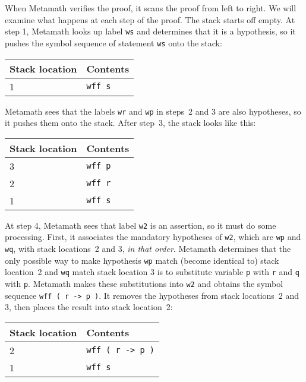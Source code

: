 When Metamath verifies the proof, it scans the proof from left to right.  We
will examine what happens at each step of the proof.  The stack starts off
empty.  At step 1, Metamath looks up label \texttt{ws} and determines that it is a
hypothesis, so it pushes the symbol sequence of statement \texttt{ws} onto the
stack:

\begin{center}\begin{tabular}{|l|l|}\hline
{Stack location} & {Contents} \\ \hline \hline
1 & \texttt{wff s} \\ \hline
\end{tabular}\end{center}

Metamath sees that the labels \texttt{wr} and \texttt{wp} in steps~2 and 3 are also
hypotheses, so it pushes them onto the stack.  After step~3, the stack looks
like
this:

\begin{center}\begin{tabular}{|l|l|}\hline
{Stack location} & {Contents} \\ \hline \hline
3 & \texttt{wff p} \\ \hline
2 & \texttt{wff r} \\ \hline
1 & \texttt{wff s} \\ \hline
\end{tabular}\end{center}

At step 4, Metamath sees that label \texttt{w2} is an assertion, so it must do
some processing.  First, it associates the mandatory hypotheses of \texttt{w2},
which are \texttt{wp} and \texttt{wq}, with stack locations~2 and 3, {\em in that
order}. Metamath determines that the only possible way
to make hypothesis \texttt{wp} match (become identical to) stack location~2 and
\texttt{wq} match stack location 3 is to substitute variable \texttt{p} with \texttt{r}
and \texttt{q} with \texttt{p}.  Metamath makes these substitutions into \texttt{w2} and
obtains the symbol sequence \texttt{wff ( r -> p )}.  It removes the hypotheses
from stack locations~2 and 3, then places the result into stack location~2:

\begin{center}\begin{tabular}{|l|l|}\hline
{Stack location} & {Contents} \\ \hline \hline
2 & \texttt{wff ( r -> p )} \\ \hline
1 & \texttt{wff s} \\ \hline
\end{tabular}\end{center}

